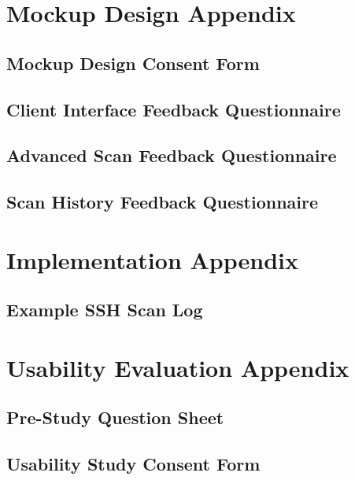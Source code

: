 \chapter{Mockup Design Appendix}

\section{Mockup Design Consent Form}

 \clearpage

\section{Client Interface Feedback Questionnaire}

 \clearpage

\section{Advanced Scan Feedback Questionnaire}

 \clearpage

\section{Scan History Feedback Questionnaire}

 \clearpage

\chapter{Implementation Appendix}

\section{Example SSH Scan Log}

\begin{figure}[h]
	
\end{figure}
\clearpage

\chapter{Usability Evaluation Appendix}

\section{Pre-Study Question Sheet}



\section{Usability Study Consent Form}


